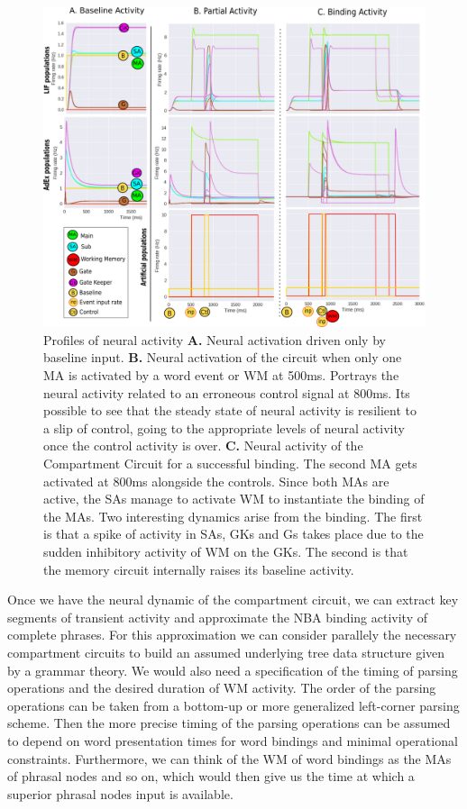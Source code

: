 \documentclass[10pt]{article}
\begin{document}
\begin{figure}[h!]
  \begin{center}
    \includegraphics[width=0.70\columnwidth]{figures/compartment_circuit_dynamics/compartment_circuit_dynamics}
    \caption{Profiles of neural activity \textbf{A.} Neural activation driven
      only by baseline input. \textbf{B.} Neural activation of the circuit when
      only one MA is activated by a word event or WM at 500ms.
      Portrays the neural activity related to an erroneous control
      signal at 800ms. Its possible to see that the steady state of
      neural activity is resilient to a slip of control, going to the
      appropriate levels of neural activity once the control activity
      is over. \textbf{C.} Neural activity of the Compartment Circuit for a
      successful binding. The second MA gets activated at 800ms
      alongside the controls. Since both MAs are active, the SAs
      manage to activate WM to instantiate the binding of the MAs. Two
      interesting dynamics arise from the binding. The first is that a
      spike of activity in SAs, GKs and Gs takes place due to the
      sudden inhibitory activity of WM on the GKs. The second is that
      the memory circuit internally raises its baseline activity.%
    }

      \label{activity_profiles}
  \end{center}
\end{figure}

Once we have the neural dynamic of the compartment circuit, we can
extract key segments of transient activity and approximate the NBA
binding activity of complete phrases. For this approximation we can
consider parallely the necessary compartment circuits to build an
assumed underlying tree data structure given by a grammar theory. We
would also need a specification of the timing of parsing operations
and the desired duration of WM activity. The order of the parsing
operations can be taken from a bottom-up or more generalized
left-corner parsing scheme. Then the more precise timing of the
parsing operations can be assumed to depend on word presentation times
for word bindings and minimal operational constraints. Furthermore, we
can think of the WM of word bindings as the MAs of phrasal nodes and
so on, which would then give us the time at which a superior phrasal
nodes input is available.
\end{document}
